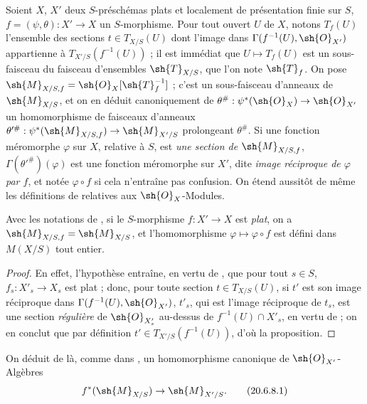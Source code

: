 \begin{env}[20.6.7]
Soient $X$, $X'$ deux $S$-préschémas plats et localement de présentation finie sur $S$, $f=(\psi,\theta):X'\to X$ un $S$-morphisme.
Pour tout ouvert $U$ de $X$, notons $T_f(U)$ l'ensemble des sections $t\in T_{X/S}(U)$ dont l'image dans $\Gamma(f^{-1}(U),\sh{O}_{X'})$ appartienne à $T_{X'/S}(f^{-1}(U))$ ; il est immédiat que $U\mapsto T_f(U)$ est un sous-faisceau du faisceau d'ensembles $\sh{T}_{X/S}$, que l'on note $\sh{T}_f$.
On pose $\sh{M}_{X/S,f}=\sh{O}_X[\sh{T}_f^{-1}]$ ; c'est un sous-faisceau d'anneaux de $\sh{M}_{X/S}$, et on en déduit canoniquement de $\theta^\#: \psi^*(\sh{O}_X)\to\sh{O}_{X'}$ un homomorphisme de faisceaux d'anneaux $\theta'^\#: \psi^*(\sh{M}_{X/S,f})\to\sh{M}_{X'/S}$ prolongeant $\theta^\#$.
Si une fonction méromorphe $\varphi$ sur $X$, relative à $S$, est \emph{une section de $\sh{M}_{X/S,f}$}, $\Gamma(\theta'^\#)(\varphi)$ est une fonction méromorphe sur $X'$, dite \emph{image réciproque de $\varphi$ par $f$}, et notée $\varphi\circ f$ si cela n'entraîne pas confusion.
On étend aussitôt de même les définitions de  relatives aux $\sh{O}_X$-Modules.
\end{env}

\begin{proposition}[20.6.8]
\label{IV.20.6.8}
Avec les notations de , si le $S$-morphisme $f:X'\to X$ est \emph{plat}, on a $\sh{M}_{X/S,f}=\sh{M}_{X/S}$, et l'homomorphisme $\varphi\mapsto\varphi\circ f$ est défini dans $M(X/S)$ tout entier.
\end{proposition}

\begin{proof}
En effet, l'hypothèse entraîne, en vertu de , que pour tout $s\in S$, $f_s:X'_s\to X_s$ est plat ; donc, pour toute section $t\in T_{X/S}(U)$, si $t'$ est son image réciproque dans $\Gamma(f^{-1}(U),\sh{O}_{X'})$, $t'_{s}$, qui est l'image réciproque de $t_s$, est une section \emph{régulière} de $\sh{O}_{X'_s}$ au-dessus de $f^{-1}(U)\cap X'_s$, en vertu de  ; on en conclut que par définition $t'\in T_{X'/S}(f^{-1}(U))$, d'où la proposition.
\end{proof}

On déduit de là, comme dans , un homomorphisme canonique de $\sh{O}_{X'}$-Algèbres
\[
\label{IV.20.6.8.1}
  f^*(\sh{M}_{X/S})\to\sh{M}_{X'/S}.
  \tag{20.6.8.1}
\]

